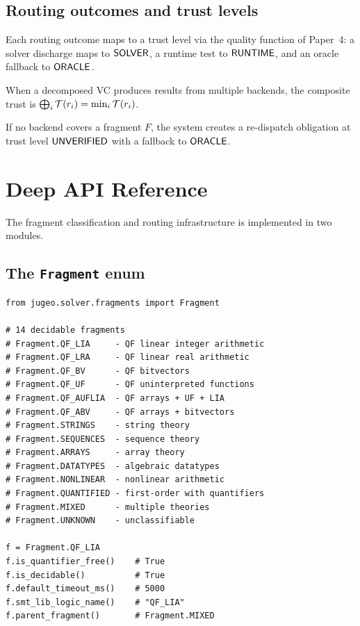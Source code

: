 \documentclass[11pt]{article}
\begin{document}
\subsection{Routing outcomes and trust levels}

Each routing outcome maps to a trust level via the quality
function of Paper~4: a solver discharge maps to $\mathsf{SOLVER}$,
a runtime test to $\mathsf{RUNTIME}$, and an oracle fallback to
$\mathsf{ORACLE}$.

\begin{lemma}
\label{lem:join}
When a decomposed VC produces results from multiple backends,
the composite trust is $\bigoplus_i \mathcal{T}(r_i) = \min_i \mathcal{T}(r_i)$.
\end{lemma}

\begin{lemma}\label{lem:redispatch}
If no backend covers a fragment $F$, the system creates a
re-dispatch obligation at trust level $\mathsf{UNVERIFIED}$ with a
fallback to $\mathsf{ORACLE}$.
\end{lemma}


\section{Deep \JuGeo{} API Reference}\label{sec:api}

The fragment classification and routing infrastructure is
implemented in two modules.

\subsection{The \texttt{Fragment} enum}

\begin{lstlisting}[caption={The Fragment enum.},label=lst:fragment-enum]
from jugeo.solver.fragments import Fragment

# 14 decidable fragments
# Fragment.QF_LIA     - QF linear integer arithmetic
# Fragment.QF_LRA     - QF linear real arithmetic
# Fragment.QF_BV      - QF bitvectors
# Fragment.QF_UF      - QF uninterpreted functions
# Fragment.QF_AUFLIA  - QF arrays + UF + LIA
# Fragment.QF_ABV     - QF arrays + bitvectors
# Fragment.STRINGS    - string theory
# Fragment.SEQUENCES  - sequence theory
# Fragment.ARRAYS     - array theory
# Fragment.DATATYPES  - algebraic datatypes
# Fragment.NONLINEAR  - nonlinear arithmetic
# Fragment.QUANTIFIED - first-order with quantifiers
# Fragment.MIXED      - multiple theories
# Fragment.UNKNOWN    - unclassifiable

f = Fragment.QF_LIA
f.is_quantifier_free()    # True
f.is_decidable()          # True
f.default_timeout_ms()    # 5000
f.smt_lib_logic_name()    # "QF_LIA"
f.parent_fragment()       # Fragment.MIXED
\end{lstlisting}
\end{document}
